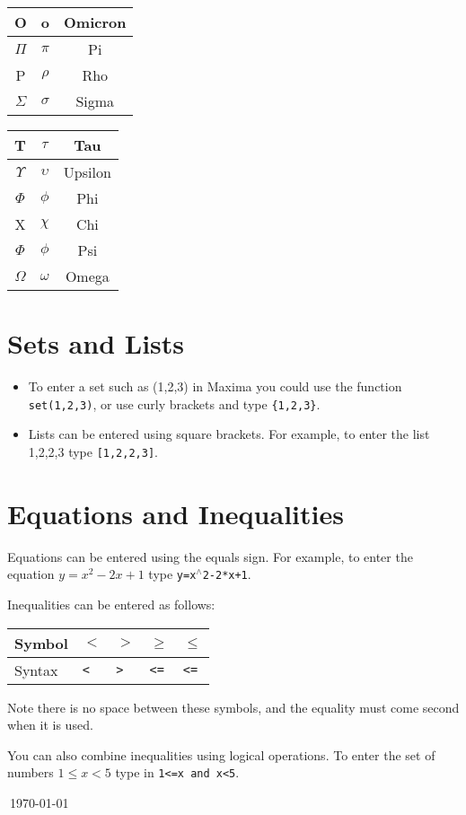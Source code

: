 \documentclass[a4paper]{article}
\newcommand{\stack}[1]{{\color{red}\tt #1}}
\begin{document}
\begin{multicols}{2}
\begin{table}[H]
\begin{minipage}{0.22\linewidth}
\begin{tabular}{|c|c|c|}
O & o & Omicron \\ \hline
$\Pi$ & $\pi$ & Pi \\ \hline
P & $\rho$ & Rho \\ \hline
$\Sigma$ & $\sigma$ & Sigma \\ \hline
\end{tabular}
\end{minipage}
\hspace{0.2cm}
\begin{minipage}{0.22\linewidth}
\centering
\begin{tabular}{|c|c|c|} \hline
T & $\tau$ & Tau \\ \hline
$\Upsilon$ & $\upsilon$ & Upsilon \\ \hline
$\Phi$ & $\phi$ & Phi \\ \hline
X & $\chi$ & Chi \\ \hline
$\Phi$ & $\phi$ & Psi \\ \hline
$\Omega$ & $\omega$ & Omega \\ \hline
\end{tabular}
\end{minipage}
\end{table}

\section*{Sets and Lists}
\begin{itemize}
\item To enter a set such as ({1,2,3}) in Maxima you could use the function \stack{set(1,2,3)}, or use curly brackets and type \stack{\{1,2,3\}}.
\item Lists can be entered using square brackets. For example, to enter the list 1,2,2,3 type \stack{[1,2,2,3]}.
\end{itemize}

\section*{Equations and Inequalities}
Equations can be entered using the equals sign. For example, to enter the equation $y=x^2-2x+1$ type \stack{y=x$^{\wedge}$2-2*x+1}.

Inequalities can be entered as follows:
\begin{center}
\begin{tabular}{l|l|l|l|l}
Symbol & $<$ & $>$ & $\geq$ & $\leq$\\
\hline
Syntax & \stack{<} & \stack{>} & \stack{<=} & \stack{<=}
\end{tabular}
\end{center}

Note there is no space between these symbols, and the equality must come second when it is used.

You can also combine inequalities using logical operations.  To enter the set of numbers $1\leq x <5$ type in \stack{1<=x and x<5}.
\end{multicols}

$~$\hfill{\tiny \today}
\end{document}
